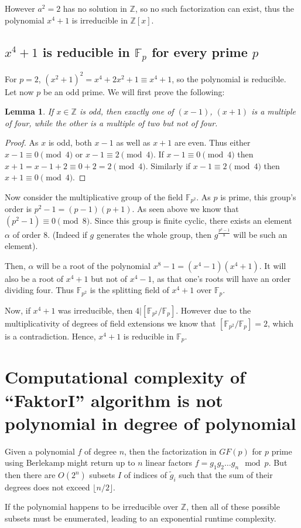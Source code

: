 \documentclass[a4paper]{scrreprt}
\newtheorem{lemma}[theorem]{Lemma}
\begin{document}
However $a^2 = 2$ has no solution in $\mathbb{Z}$, so no such factorization can
exist, thus the polynomial $x^4 + 1$ is irreducible in $\mathbb{Z}[x]$.

\subsection{$x^4 + 1$ is reducible in $\mathbb{F}_p$ for every prime $p$}

For $p = 2$, $(x^2 + 1)^2 = x^4 + 2 x^2 + 1 \equiv x^4 + 1$, so the polynomial
is reducible. Let now $p$ be an odd prime. We will first prove the following:

\begin{lemma}
		If $x \in \mathbb{Z}$ is odd, then exactly one of $(x - 1)$, $(x + 1)$
		is a multiple of four, while the other is a multiple of two but not of
		four.
\end{lemma}

\begin{proof}
		As $x$ is odd, both $x - 1$ as well as $x + 1$ are even. Thus either $x
		- 1 \equiv 0 \pmod{4}$ or $x - 1 \equiv 2 \pmod{4}$. If $x - 1 \equiv 0
		\pmod{4}$ then $x + 1 = x - 1 + 2 \equiv 0 + 2 = 2 \pmod{4}$. Similarly
		if $x - 1 \equiv 2 \pmod{4}$ then $x + 1 \equiv 0 \pmod{4}$.
\end{proof}

Now consider the multiplicative group of the field $\mathbb{F}_{p^2}$. As $p$
is prime, this group's order is $p^2 - 1 = (p - 1) (p + 1)$. As seen above we
know that $(p^2 - 1) \equiv 0 \pmod{8}$. Since this group is finite cyclic,
there exists an element $\alpha$ of order $8$. (Indeed if $g$ generates the
whole group, then $g^\frac{p^2 - 1}{8}$ will be such an element).

Then, $\alpha$ will be a root of the polynomial $x^8 - 1 = (x^4 - 1)(x^4 + 1)$.
It will also be a root of $x^4 + 1$ but not of $x^4 - 1$, as that one's roots
will have an order dividing four. Thus $\mathbb{F}_{p^2}$ is the splitting
field of $x^4 + 1$ over $\mathbb{F}_p$. 

Now, if $x^4 + 1$ was irreducible, then $4 | [\mathbb{F}_{p^2} /
\mathbb{F}_p]$. However due to the multiplicativity of degrees of field
extensions we know that $[\mathbb{F}_{p^2} / \mathbb{F}_p] = 2$, which is a
contradiction. Hence, $x^4 + 1$ is reducible in $\mathbb{F}_p$.

\section{Computational complexity of ``FaktorI'' algorithm is not polynomial in degree of polynomial}

Given a polynomial $f$ of degree $n$, then the factorization in $GF(p)$ for $p$
prime using Berlekamp might return up to $n$ linear factors $f = g_1 g_2 \ldots
g_n \mod{p}$. But then there are $O(2^n)$ subsets $I$ of indices of
$\tilde{g}_i$ such that the sum of their degrees does not exceed $\lfloor n/2
\rfloor$.

If the polynomial happens to be irreducible over $\mathbb{Z}$, then all of
these possible subsets must be enumerated, leading to an exponential runtime
complexity.

\printbibliography{}
\end{document}
